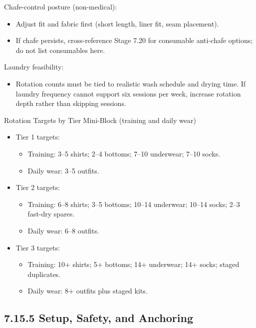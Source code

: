 \documentclass[10pt]{article}
\begin{document}
Chafe-control posture (non-medical):

\begin{itemize}
\item Adjust fit and fabric first (short length, liner fit, seam placement).
\item If chafe persists, cross-reference Stage 7.20 for consumable anti-chafe options; do not list consumables here.
\end{itemize}

Laundry feasibility:

\begin{itemize}
\item Rotation counts must be tied to realistic wash schedule and drying time. If laundry frequency cannot support six sessions per week, increase rotation depth rather than skipping sessions.
\end{itemize}

Rotation Targets by Tier Mini-Block (training and daily wear)

\begin{itemize}
\item Tier 1 targets:
  \begin{itemize}
  \item Training: 3–5 shirts; 2–4 bottoms; 7–10 underwear; 7–10 socks.
  \item Daily wear: 3–5 outfits.
  \end{itemize}
\item Tier 2 targets:
  \begin{itemize}
  \item Training: 6–8 shirts; 3–5 bottoms; 10–14 underwear; 10–14 socks; 2–3 fast-dry spares.
  \item Daily wear: 6–8 outfits.
  \end{itemize}
\item Tier 3 targets:
  \begin{itemize}
  \item Training: 10+ shirts; 5+ bottoms; 14+ underwear; 14+ socks; staged duplicates.
  \item Daily wear: 8+ outfits plus staged kits.
  \end{itemize}
\end{itemize}

\subsection*{7.15.5 Setup, Safety, and Anchoring}
{}
\end{document}

